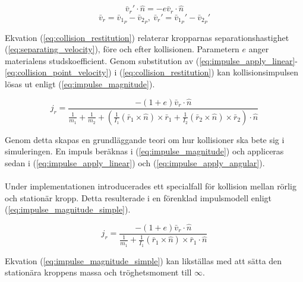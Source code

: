 \documentclass[a4paper,12pt,twopage,swedish]{article}
\begin{document}
\begin{equation}\label{eq:collision_restitution}
\bar{v}_r' \cdot \hat{n} = -e\bar{v}_r \cdot \hat{n}
\end{equation}
\begin{equation}\label{eq:separating_velocity}
\bar{v}_r = \bar{v}_{1_P} - \bar{v}_{2_P}, \ \bar{v}_r' = \bar{v}_{1_P}' - \bar{v}_{2_P}'
\end{equation}

Ekvation (\ref{eq:collision_restitution}) relaterar kropparnas separationshastighet (\ref{eq:separating_velocity}), före och efter kollisionen. Parametern $e$ anger materialens studskoefficient. Genom substitution av (\ref{eq:impulse_apply_linear}-\ref{eq:collision_point_velocity}) i (\ref{eq:collision_restitution}) kan kollisionsimpulsen lösas ut enligt (\ref{eq:impulse_magnitude}).

\begin{equation}\label{eq:impulse_magnitude}
j_r = \frac{-(1+e)\bar{v}_r \cdot \hat{n}}
{\frac{1}{m_1}+\frac{1}{m_2}+(\frac{1}{I_1}(\bar{r}_1 \times \hat{n}) \times \bar{r}_1+\frac{1}{I_2}(\bar{r}_2 \times \hat{n}) \times \bar{r}_2)\cdot \hat{n}}
\end{equation}

Genom detta skapas en grundläggande teori om hur kollisioner ska bete sig i simuleringen. En impuls beräknas i (\ref{eq:impulse_magnitude}) och appliceras sedan i (\ref{eq:impulse_apply_linear}) och (\ref{eq:impulse_apply_angular}).
\\
\\Under implementationen introducerades ett specialfall för kollision mellan rörlig och stationär kropp. Detta resulterade i en förenklad impulsmodell enligt (\ref{eq:impulse_magnitude_simple}).

\begin{equation}\label{eq:impulse_magnitude_simple}
j_r = \frac{-(1+e)\bar{v}_r \cdot \hat{n}}
{\frac{1}{m_1}+\frac{1}{I_1}(\bar{r}_1 \times \hat{n}) \times \bar{r}_1 \cdot \hat{n}}
\end{equation}

Ekvation (\ref{eq:impulse_magnitude_simple}) kan likställas med att sätta den stationära kroppens massa och tröghetsmoment till $\infty$.
\end{document}

